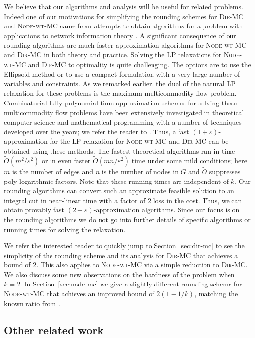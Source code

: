\documentclass[11pt]{article}
\def\eps{\varepsilon}
\def\DirMC{\textsc{Dir-MC}\xspace}
\def\NodeMC{\textsc{Node-wt-MC}\xspace}
\def\NodeMC{\textsc{Node-wt-MC}\xspace}
\begin{document}
We believe that our algorithms and analysis will be useful for related
problems. Indeed one of our motivations for simplifying the rounding
schemes for \DirMC and \NodeMC came from attempts to obtain algorithms
for a problem with applications to network information theory
\cite{KKCV15}. A significant consequence of our rounding algorithms
are much faster approximation algorithms for \NodeMC and \DirMC in
both theory and practice. Solving the LP relaxations for \NodeMC and
\DirMC to optimality is quite challenging. The options are to use the
Ellipsoid method or to use a compact formulation with a very large
number of variables and constraints. As we remarked earlier, the dual
of the natural LP relaxation for these problems is the maximum
multicommodity flow problem. Combinatorial fully-polynomial time
approximation schemes for solving these multicommodity flow problems
have been extensively investigated in theoretical computer science and
mathematical programming with a number of techniques developed over
the years; we refer the reader to
\cite{PST95,GrigoriadisK94,Young95,Bienstock-book,GargK,Fleischer,BienstockI06,Madry10}. Thus,
a fast $(1+\eps)$-approximation for the LP relaxation for \NodeMC and
\DirMC can be obtained using these methods. The fastest theoretical
algorithms run in time $\tilde{O}(m^2/\eps^2)$ \cite{Fleischer,GargK}
or in even faster $\tilde{O}(mn/\eps^2)$ time \cite{Madry10} under
some mild conditions; here $m$ is the number of edges and $n$ is the
number of nodes in $G$ and $\tilde{O}$ suppresses poly-logarithmic
factors. Note that these running times are independent of $k$.  Our
rounding algorithms can convert such an approximate feasible solution
to an integral cut in near-linear time with a factor of $2$ loss in
the cost.  Thus, we can obtain provably fast $(2+\eps)$-approximation
algorithms. Since our focus is on the rounding algorithms we do not go
into further details of specific algorithms or running times for
solving the relaxation.

We refer the interested reader to quickly jump to
Section~\ref{sec:dir-mc} to see the simplicity of the rounding scheme
and its analysis for \DirMC that achieves a bound of $2$. This also
applies to \NodeMC via a simple reduction to \DirMC. We also discuss
some new observations on the hardness of the problem when $k=2$. In
Section~\ref{sec:node-mc} we give a slightly different rounding scheme
for \NodeMC that achieves an improved bound of $2(1-1/k)$, matching
the known ratio from \cite{GargVY04}.

\subsection{Other related work}
\label{subsec:related-work}
\end{document}
